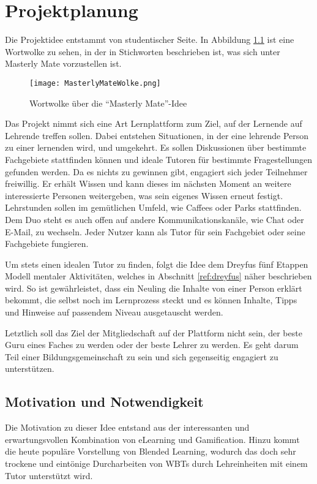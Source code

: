 \chapter{Projektplanung}
Die Projektidee entstammt von studentischer Seite. In Abbildung
\ref{ref:wolkeMM} ist eine Wortwolke zu sehen, in der in Stichworten beschrieben
ist, was sich unter Masterly Mate vorzustellen ist.

\begin{figure}[H]
\texttt{[image: MasterlyMateWolke.png]}
\caption{Wortwolke über die "`Masterly Mate"'-Idee}\label{ref:wolkeMM}
\end{figure}

Das Projekt nimmt sich eine Art Lernplattform zum Ziel, auf der Lernende auf
Lehrende treffen sollen. Dabei entstehen Situationen, in der eine lehrende
Person zu einer lernenden wird, und umgekehrt. Es sollen Diskussionen über
bestimmte Fachgebiete stattfinden können und ideale Tutoren für bestimmte
Fragestellungen gefunden werden. Da es nichts zu gewinnen gibt, engagiert sich
jeder Teilnehmer freiwillig. Er erhält Wissen und kann dieses im nächsten Moment
an weitere interessierte Personen weitergeben, was sein eigenes Wissen erneut
festigt. Lehrstunden sollen im gemütlichen Umfeld, wie Caffees oder Parks
stattfinden. Dem Duo steht es auch offen auf andere Kommunikationskanäle, wie
Chat oder E-Mail, zu wechseln. Jeder Nutzer kann als Tutor für sein Fachgebiet
oder seine Fachgebiete fungieren.

Um stets einen idealen Tutor zu finden, folgt die Idee dem Dreyfus fünf Etappen
Modell mentaler Aktivitäten, welches in Abschnitt \ref{ref:dreyfus} näher
beschrieben wird. So ist gewährleistet, dass ein Neuling die Inhalte von einer
Person erklärt bekommt, die selbst noch im Lernprozess steckt und es können
Inhalte, Tipps und Hinweise auf passendem Niveau ausgetauscht werden.

Letztlich soll das Ziel der Mitgliedschaft auf der Plattform nicht sein, der
beste Guru eines Faches zu werden oder der beste Lehrer zu werden. Es geht darum
Teil einer Bildungsgemeinschaft zu sein und sich gegenseitig engagiert zu
unterstützen.

\section{Motivation und Notwendigkeit}\label{ref:projectMotivation}
Die Motivation zu dieser Idee entstand aus der interessanten und
erwartungsvollen Kombination von eLearning und Gamification. Hinzu kommt die
heute populäre Vorstellung von Blended Learning, wodurch das doch sehr trockene
und eintönige Durcharbeiten von WBTs durch Lehreinheiten mit einem Tutor
unterstützt wird.

